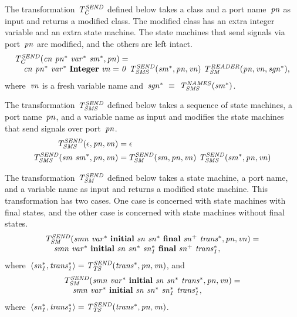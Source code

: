 The transformation~$T_{\it{C}}^{\it{SEND}}$ defined below takes a class and a port name~$\it{pn}$ as input and returns a modified class.
The modified class has an extra integer variable and an extra state machine.
The state machines that send signals via port~$\it{pn}$ are modified, and the others are left intact.
%
\[
\begin{array}{l}
T_{\it{C}}^{\it{SEND}}(\it{cn}~\it{pn^*}~\it{var^*}~\it{sm^*}, \it{pn}) = \\
\quad \it{cn}
~ \it{pn^*}
~ \it{var^*}~\textbf{Integer}~\it{vn}=0
~ T_{\it{SMS}}^{\it{SEND}}(\it{sm^*}, \it{pn}, \it{vn})~T_{\it{SM}}^{\it{READER}}(\it{pn}, \it{vn}, \it{sgn^*}),
\end{array}
\]
where~$\it{vn}$ is a fresh variable name and~$\it{sgn^*}~\equiv~T_{\it{SMS}}^{\it{NAMES}}(\it{sm^*})$.

The transformation~$T_{\it{SMS}}^{\it{SEND}}$ defined below takes a sequence of state machines, a port name~$\it{pn}$, and a variable name as input and modifies the state machines that send signals over port~$\it{pn}$.
%
\begin{align*}
T_{\it{SMS}}^{\it{SEND}}(\epsilon, \it{pn}, \it{vn}) & = \epsilon \\
T_{\it{SMS}}^{\it{SEND}}(\it{sm}~\it{sm^*}, \it{pn}, \it{vn}) & = T_{\it{SM}}^{\it{SEND}}(\it{sm}, \it{pn}, \it{vn})~T_{\it{SMS}}^{\it{SEND}}(\it{sm^*}, \it{pn}, \it{vn})
\end{align*}

The transformation~$T_{\it{SM}}^{\it{SEND}}$ defined below takes a state machine, a port name, and a variable name as input and returns a modified state machine.
This transformation has two cases.
One case is concerned with state machines with final states, and the other case is concerned with state machines without final states.
%
\[
\begin{array}{l}
T_{\it{SM}}^{\it{SEND}}(\it{smn}~\it{var^*}~\textbf{initial}~\it{sn}~\it{sn^*}~\textbf{final}~\it{sn^+}~\it{trans^*}, \it{pn}, \it{vn}) = \\
\quad \it{smn}~\it{var^*}~\textbf{initial}~\it{sn}~\it{sn^*}~\it{sn^*_1}~\textbf{final}~\it{sn^+}~\it{trans^*_1},
\end{array}
\]
where~$\langle \it{sn^*_1}, \it{trans^*_1} \rangle = T_{\it{TS}}^{\it{SEND}}(\it{trans^*}, \it{pn}, \it{vn})$, and
%
\[
\begin{array}{l}
T_{\it{SM}}^{\it{SEND}}(\it{smn}~\it{var^*}~\textbf{initial}~\it{sn}~\it{sn^*}~\it{trans^*}, \it{pn}, \it{vn}) = \\
\quad \it{smn}~\it{var^*}~\textbf{initial}~\it{sn}~\it{sn^*}~\it{sn^*_1}~\it{trans^*_1},
\end{array}
\]
where~$\langle \it{sn^*_1}, \it{trans^*_1} \rangle = T_{\it{TS}}^{\it{SEND}}(\it{trans^*}, \it{pn}, \it{vn})$.

